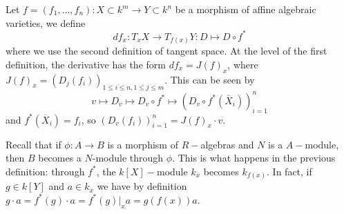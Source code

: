 \begin{dang}
    \begin{definition}
        Let $f=(f_1,\dots, f_n):X\subset k^m\to Y\subset k^n$ be a morphism of affine algebraic varieties, we define 
        \begin{equation}
            df_x:T_xX\to T_{f(x)}Y: D\mapsto D\circ f^*
        \end{equation}
        where we use the second definition of tangent space. At the level of the first definition, the derivative 
        has the form $df_x = J(f)_x$, where $J(f)_x = (D_j(f_i))_{1\leq i\leq n,1\leq j\leq m}$. This can be seen by 
        \begin{equation}
            v\mapsto D_v \mapsto D_v\circ f^* \mapsto (D_v\circ f^*(\overline{X}_i))_{i=1}^n
        \end{equation}
        and $f^*(\overline{X}_i)= f_i$, so $(D_v(f_i))_{i=1}^n = J(f)_x\cdot v$.
    \end{definition}
\end{dang}
Recall that if $\phi: A\to B$ is a morphism of $R-$algebras and $N$ is a $A-$module, then 
$B$ becomes a $N$-module through $\phi$. This is what happens in the previous definition: through 
$f^*$, the $k[X]-$module $k_x$ becomes $k_{f(x)}$. In fact, if $g\in k[Y]$ and $a\in k_x$ we have 
by definition $g\cdot a = f^*(g)\cdot a = f^*(g)|_x a = g(f(x))a$.

